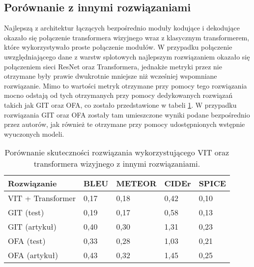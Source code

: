 \subsection{Porównanie z innymi rozwiązaniami}
Najlepszą z architektur łączących bezpośrednio moduły kodujące i dekodujące okazało się połączenie transformera wizyjnego wraz z klasycznym transformerem, które wykorzystywało proste połączenie modułów. W przypadku połączenie uwzględniającego dane z warstw splotowych najlepszym rozwiązaniem okazało się połączeniem sieci ResNet oraz Transformera, jednakże metryki przez nie otrzymane były prawie dwukrotnie mniejsze niż wcześniej wspomniane rozwiązanie. Mimo to wartości metryk otrzymane przy pomocy tego rozwiązania mocno odstają od tych otrzymanych przy pomocy dedykowanych rozwiązań takich jak GIT oraz OFA, co zostało przedstawione w tabeli \ref{tab:comparison}. W przypadku rozwiązania GIT oraz OFA zostały tam umieszczone wyniki podane bezpośrednio przez autorów, jak również te otrzymane przy pomocy udostępnionych wstępnie wyuczonych modeli.
\begin{table}[H]
    \centering
    \caption{Porównanie skuteczności rozwiązania wykorzystującego VIT oraz transformera wizyjnego z innymi rozwiązaniami.}
    \label{tab:comparison}
    \begin{tabular}{|l|l|l|l|l|}
        \hline
        \textbf{Rozwiązanie} & \textbf{BLEU} & \textbf{METEOR} & \textbf{CIDEr} & \textbf{SPICE} \\ \hline
        VIT + Transformer    & 0,17          & 0,18            & 0,42           & 0,10           \\ \hline
        GIT (test)           & 0,19          & 0,17            & 0,58           & 0,13           \\ \hline
        GIT (artykuł)        & 0,40          & 0,30            & 1,31           & 0,23           \\ \hline
        OFA (test)           & 0,33          & 0,28            & 1,03           & 0,21           \\ \hline
        OFA  (artykuł)       & 0,43          & 0,32            & 1,45           & 0,25           \\ \hline
    \end{tabular}
\end{table}
